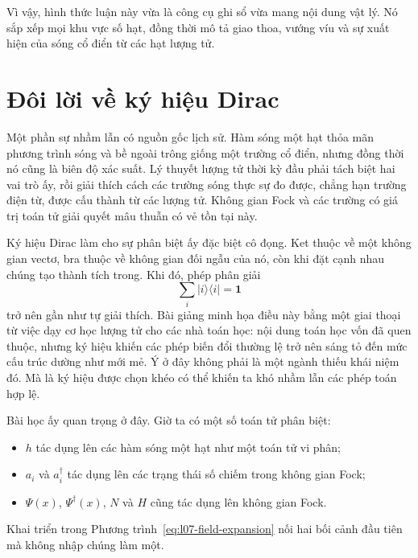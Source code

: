 Vì vậy, hình thức luận này vừa là công cụ ghi sổ vừa mang nội dung vật lý. Nó sắp xếp mọi khu vực số hạt, đồng thời mô tả giao thoa, vướng víu và sự xuất hiện của sóng cổ điển từ các hạt lượng tử.

\begin{classroomqa}
\end{classroomqa}

\section{Đôi lời về ký hiệu Dirac}

Một phần sự nhầm lẫn có nguồn gốc lịch sử. Hàm sóng một hạt thỏa mãn phương trình sóng và bề ngoài trông giống một trường cổ điển, nhưng đồng thời nó cũng là biên độ xác suất. Lý thuyết lượng tử thời kỳ đầu phải tách biệt hai vai trò ấy, rồi giải thích cách các trường sóng thực sự đo được, chẳng hạn trường điện từ, được cấu thành từ các lượng tử. Không gian Fock và các trường có giá trị toán tử giải quyết mâu thuẫn có vẻ tồn tại này.

Ký hiệu Dirac làm cho sự phân biệt ấy đặc biệt cô đọng. Ket thuộc về một không gian vectơ, bra thuộc về không gian đối ngẫu của nó, còn khi đặt cạnh nhau chúng tạo thành tích trong. Khi đó, phép phân giải
\begin{equation}
\sum_i|i\rangle\langle i|=\mathbf 1
\end{equation}
trở nên gần như tự giải thích. Bài giảng minh họa điều này bằng một giai thoại từ việc dạy cơ học lượng tử cho các nhà toán học: nội dung toán học vốn đã quen thuộc, nhưng ký hiệu khiến các phép biến đổi thường lệ trở nên sáng tỏ đến mức cấu trúc dường như mới mẻ. Ý ở đây không phải là một ngành thiếu khái niệm đó. Mà là ký hiệu được chọn khéo có thể khiến ta khó nhầm lẫn các phép toán hợp lệ.

Bài học ấy quan trọng ở đây. Giờ ta có một số toán tử phân biệt:
\begin{itemize}
\item \(h\) tác dụng lên các hàm sóng một hạt như một toán tử vi phân;
\item \(a_i\) và \(a_i^\dagger\) tác dụng lên các trạng thái số chiếm trong không gian Fock;
\item \(\Psi(x)\), \(\Psi^\dagger(x)\), \(N\) và \(H\) cũng tác dụng lên không gian Fock.
\end{itemize}
Khai triển trong Phương trình~\eqref{eq:l07-field-expansion} nối hai bối cảnh đầu tiên mà không nhập chúng làm một.

